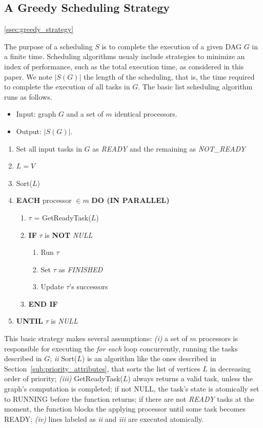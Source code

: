 \documentclass[twocolumn]{svjour3}
\begin{document}
\subsection{A Greedy Scheduling Strategy} \ref{ssec:greedy_strategy}

The purpose of a scheduling $S$ is to complete the execution of a given DAG $G$ in a finite time. Scheduling algorithms usualy include strategies to minimize an index of performance, such as the total execution time, as considered in this paper. We note $|S(G)|$ the length of the scheduling, that is, the time required to complete the execution of all tasks in $G$. The basic list scheduling algorithm runs as follows.

{\small
\begin{itemize}
\item Input: graph $G$ and a set of $m$ identical processors.
\item Output: $|S(G)|$.
\end{itemize}
\begin{enumerate}
\item Set all input tasks in $G$ as \emph{READY} and the remaining as \emph{NOT\_READY}
\item $L = V$
\item Sort($L$)
\item \textbf{EACH} processor $\in m$ \textbf{DO (IN PARALLEL)}
   \begin{enumerate}
		\item $\tau$ = GetReadyTask($L$)
		\item \textbf{IF} $\tau$ is \textbf{NOT} \emph{NULL}
            \begin{enumerate}
              \item Run $\tau$
              \item Set $\tau$ as \emph{FINISHED}
			  \item Update $\tau$'s successors
            \end{enumerate}
		\item \textbf{END IF}
   \end{enumerate}
\item \textbf{UNTIL} $\tau$ is \emph{NULL}
\end{enumerate}
}

This basic strategy makes several assumptions: \emph{(i)} a set of $m$ processors is responsible for executing the \emph{for each} loop concurrently, running the tasks described in $G$; \emph{ii} Sort($L$) is an algorithm like the ones described in Section~\ref{sub:priority_attributes}, that sorts the list of vertices $L$ in decreasing order of priority; \emph{(iii)} GetReadyTask($L$) always returns a valid task, unless the graph's computation is completed; if not NULL, the task's state is atomically set to RUNNING before the function returns; if there are not \emph{READY} tasks at the moment, the function blocks the applying processor until some task becomes READY; \emph{(iv)} lines labeled as \emph{ii} and \emph{iii} are executed atomically. 
\end{document}
